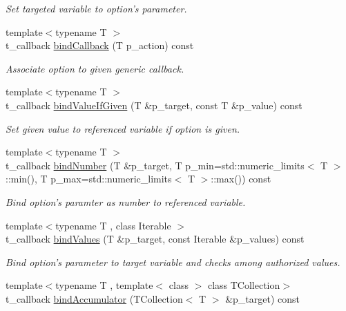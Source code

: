 \begin{DoxyCompactItemize}
\begin{DoxyCompactList}\small\item\em Set targeted variable to option's parameter. \end{DoxyCompactList}\item 
{\footnotesize template$<$typename T $>$ }\\t\-\_\-callback \hyperlink{classxtd_1_1Application_a00f6aed6c376028a79492b04e8325968}{bind\-Callback} (T p\-\_\-action) const 
\begin{DoxyCompactList}\small\item\em Associate option to given generic callback. \end{DoxyCompactList}\item 
{\footnotesize template$<$typename T $>$ }\\t\-\_\-callback \hyperlink{classxtd_1_1Application_a2415acb66badb368e726173fb884097c}{bind\-Value\-If\-Given} (T \&p\-\_\-target, const T \&p\-\_\-value) const 
\begin{DoxyCompactList}\small\item\em Set given value to referenced variable if option is given. \end{DoxyCompactList}\item 
{\footnotesize template$<$typename T $>$ }\\t\-\_\-callback \hyperlink{classxtd_1_1Application_ae5fd6c9b1d2ad5225f9d624f63df4173}{bind\-Number} (T \&p\-\_\-target, T p\-\_\-min=std\-::numeric\-\_\-limits$<$ T $>$\-::min(), T p\-\_\-max=std\-::numeric\-\_\-limits$<$ T $>$\-::max()) const 
\begin{DoxyCompactList}\small\item\em Bind option's paramter as number to referenced variable. \end{DoxyCompactList}\item 
{\footnotesize template$<$typename T , class Iterable $>$ }\\t\-\_\-callback \hyperlink{classxtd_1_1Application_aaa0388f1c96893a26cfe5522b0804dd9}{bind\-Values} (T \&p\-\_\-target, const Iterable \&p\-\_\-values) const 
\begin{DoxyCompactList}\small\item\em Bind option's parameter to target variable and checks among authorized values. \end{DoxyCompactList}\item 
{\footnotesize template$<$typename T , template$<$ class $>$ class T\-Collection$>$ }\\t\-\_\-callback \hyperlink{classxtd_1_1Application_a846da30aaf55754027608ddf5c689366}{bind\-Accumulator} (T\-Collection$<$ T $>$ \&p\-\_\-target) const 

\end{DoxyCompactItemize}
